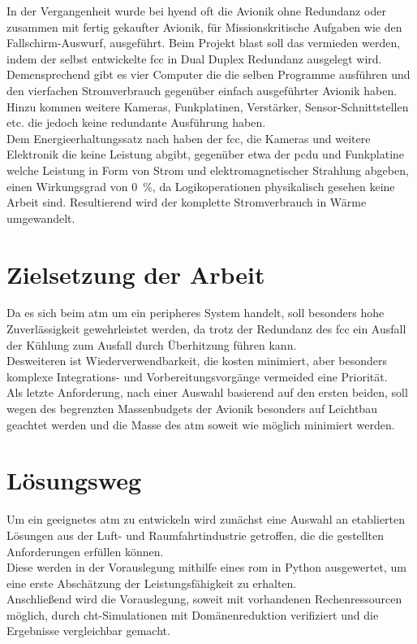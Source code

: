 In der Vergangenheit wurde bei \ac{hyend} oft die Avionik ohne Redundanz oder zusammen mit fertig gekaufter Avionik, für 
Missionskritische Aufgaben wie den Fallschirm-Auswurf, ausgeführt. Beim Projekt \ac{blast} soll das vermieden werden, 
indem der selbst entwickelte \ac{fcc} in Dual Duplex Redundanz ausgelegt wird. Demensprechend gibt es vier Computer die
die selben Programme ausführen und den vierfachen Stromverbrauch gegenüber einfach ausgeführter Avionik haben. Hinzu kommen
weitere Kameras, Funkplatinen, Verstärker, Sensor-Schnittstellen etc. die jedoch keine redundante Ausführung haben.\\

Dem Energieerhaltungssatz nach haben der \ac{fcc}, die Kameras und weitere Elektronik die keine Leistung abgibt, gegenüber etwa
der \ac{pcdu} und Funkplatine welche Leistung in Form von Strom und elektromagnetischer Strahlung abgeben, einen Wirkungsgrad von
\SI{0}{\percent}, da Logikoperationen physikalisch gesehen keine Arbeit sind. Resultierend wird der komplette Stromverbrauch
in Wärme umgewandelt.

\section{Zielsetzung der Arbeit}

Da es sich beim \ac{atm} um ein peripheres System handelt, soll besonders hohe Zuverlässigkeit gewehrleistet werden, da trotz der
Redundanz des \ac{fcc} ein Ausfall der Kühlung zum Ausfall durch Überhitzung führen kann.\\
Desweiteren ist Wiederverwendbarkeit, die kosten minimiert, aber besonders komplexe Integrations- und Vorbereitungsvorgänge
vermeided eine Priorität.\\
Als letzte Anforderung, nach einer Auswahl basierend auf den ersten beiden, soll wegen des begrenzten Massenbudgets der Avionik
besonders auf Leichtbau geachtet werden und die Masse des \ac{atm} soweit wie möglich minimiert werden.\\

\section{Lösungsweg}

Um ein geeignetes \ac{atm} zu entwickeln wird zunächst eine Auswahl an etablierten Lösungen aus der Luft- und Raumfahrtindustrie
getroffen, die die gestellten Anforderungen erfüllen können.\\

Diese werden in der Vorauslegung mithilfe eines \ac{rom} in Python ausgewertet, um eine erste Abschätzung der Leistungsfähigkeit zu erhalten.\\
Anschließend wird die Vorauslegung, soweit mit vorhandenen Rechenressourcen möglich, durch \ac{cht}-Simulationen mit Domänenreduktion
verifiziert und die Ergebnisse vergleichbar gemacht.